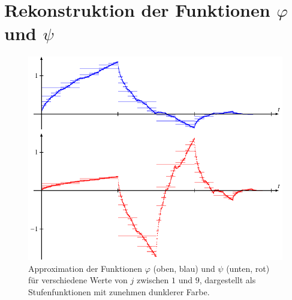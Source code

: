 %
%
%
\section{Rekonstruktion der Funktionen $\varphi$ und $\psi$
\label{section:rekonstruktion}}
\begin{figure}
\centering
\includegraphics{chapters/7-algo/images/approx.pdf}
\caption{Approximation der Funktionen $\varphi$ (oben, blau) und
$\psi$ (unten, rot) für verschiedene
Werte von $j$ zwischen $1$ und $9$, dargestellt als Stufenfunktionen
mit zunehmen dunklerer Farbe.
\label{buch:algo:approx}}
\end{figure}
